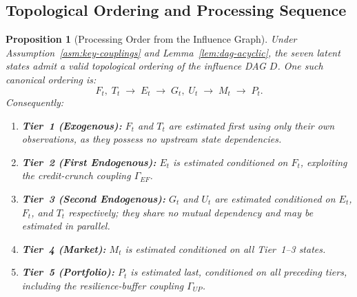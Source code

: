 \documentclass[12pt,openany]{book}
\newcommand{\calE}{\mathcal{E}}
\newcommand{\calF}{\mathcal{F}}
\newcommand{\calG}{\mathcal{G}}
\newcommand{\calP}{\mathcal{P}}
\newcommand{\calU}{\mathcal{U}}
\newcommand{\calM}{\mathcal{M}}
\newcommand{\calT}{\mathcal{T}}
\numberwithin{equation}{chapter}
\theoremstyle{plain}
\newtheorem{proposition}[theorem]{Proposition}
\theoremstyle{definition}
\theoremstyle{remark}
\def\mathcal#1{#1}%
\begin{document}
\subsection{Topological Ordering and Processing Sequence}

\begin{proposition}[Processing Order from the Influence Graph]
\label{prop:processing-order}
Under Assumption~\ref{asm:key-couplings} and
Lemma~\ref{lem:dag-acyclic}, the seven latent states admit
a valid topological ordering of the influence DAG
$\mathcal{D}$.  One such canonical ordering is:
\begin{equation}
  \calF_t,\;\calT_t
  \;\longrightarrow\;
  \calE_t
  \;\longrightarrow\;
  \calG_t,\;\calU_t
  \;\longrightarrow\;
  \calM_t
  \;\longrightarrow\;
  \calP_t.
  \label{eq:processing-order}
\end{equation}
Consequently:
\begin{enumerate}
  \item \textbf{Tier~1 (Exogenous):} $\calF_t$ and $\calT_t$
        are estimated first using only their own observations,
        as they possess no upstream state dependencies.
  \item \textbf{Tier~2 (First Endogenous):} $\calE_t$ is
        estimated conditioned on $\calF_t$, exploiting the
        credit-crunch coupling $\Gamma_{\calE\calF}$.
  \item \textbf{Tier~3 (Second Endogenous):} $\calG_t$ and
        $\calU_t$ are estimated conditioned on $\calE_t$,
        $\calF_t$, and $\calT_t$ respectively; they share
        no mutual dependency and may be estimated in parallel.
  \item \textbf{Tier~4 (Market):} $\calM_t$ is estimated
        conditioned on all Tier~1--3 states.
  \item \textbf{Tier~5 (Portfolio):} $\calP_t$ is estimated
        last, conditioned on all preceding tiers, including
        the resilience-buffer coupling $\Gamma_{\calU\calP}$.
\end{enumerate}
\end{proposition}
\end{document}
